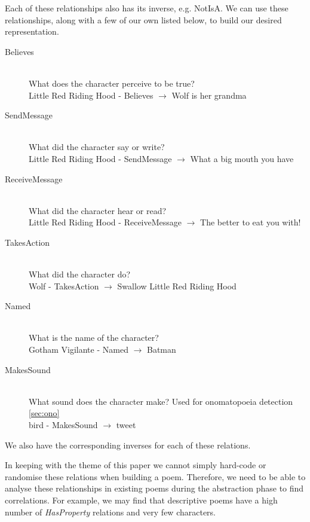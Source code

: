 Each of these relationships also has its inverse, e.g. NotIsA. We can use these relationships, along with a few of our own listed below, to build our desired representation.

\begin{description}
\item[Believes] \hfill \\ What does the character perceive to be true? \hfill \\ Little Red Riding Hood - Believes $\rightarrow$ Wolf is her grandma
\item[SendMessage] \hfill \\ What did the character say or write?  \hfill \\ Little Red Riding Hood - SendMessage $\rightarrow$ What a big mouth you have
\item[ReceiveMessage] \hfill \\ What did the character hear or read?  \hfill \\ Little Red Riding Hood - ReceiveMessage $\rightarrow$ The better to eat you with!
\item[TakesAction] \hfill \\ What did the character do?  \hfill \\ Wolf - TakesAction $\rightarrow$ Swallow Little Red Riding Hood
\item[Named] \hfill \\ What is the name of the character? \hfill \\ Gotham Vigilante - Named $\rightarrow$ Batman
\item[MakesSound] \hfill \\ What sound does the character make? Used for onomatopoeia detection \ref{sec:ono} \hfill \\ bird - MakesSound $\rightarrow$ tweet
\end{description}

We also have the corresponding inverses for each of these relations. 

In keeping with the theme of this paper we cannot simply hard-code or randomise these relations when building a poem. Therefore, we need to be able to analyse these relationships in existing poems during the abstraction phase to find correlations. For example, we may find that descriptive poems have a high number of \textit{HasProperty} relations and very few characters.  

